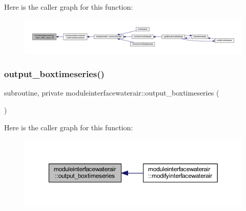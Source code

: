Here is the caller graph for this function\+:\nopagebreak
\begin{figure}[H]
\begin{center}
\leavevmode
\includegraphics[width=350pt]{namespacemoduleinterfacewaterair_a48080272c5d72deaf3fe655740d02ccc_icgraph}
\end{center}
\end{figure}
\mbox{\label{namespacemoduleinterfacewaterair_a8c2f4a754ac1aeb4a3a8045d639e609f}} 
\subsubsection{\texorpdfstring{output\+\_\+boxtimeseries()}{output\_boxtimeseries()}}
{\footnotesize\ttfamily subroutine, private moduleinterfacewaterair\+::output\+\_\+boxtimeseries (\begin{DoxyParamCaption}{ }\end{DoxyParamCaption})\hspace{0.3cm}{\ttfamily [private]}}

Here is the caller graph for this function\+:\nopagebreak
\begin{figure}[H]
\begin{center}
\leavevmode
\includegraphics[width=350pt]{namespacemoduleinterfacewaterair_a8c2f4a754ac1aeb4a3a8045d639e609f_icgraph}
\end{center}
\end{figure}
\mbox{\label{namespacemoduleinterfacewaterair_af0bc1dab0d7eafb5b7f4996d24e4d0bf}} 

